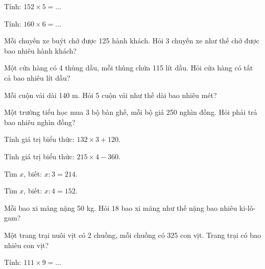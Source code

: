 \begin{ex}
Tính: $152 \times 5 = \dots$
\end{ex}

\begin{ex}
Tính: $160 \times 6 = \dots$
\end{ex}

\begin{ex}
Mỗi chuyến xe buýt chở được 125 hành khách. Hỏi 3 chuyến xe như thế chở được bao nhiêu hành khách?
\end{ex}

\begin{ex}
Một cửa hàng có 4 thùng dầu, mỗi thùng chứa 115 lít dầu. Hỏi cửa hàng có tất cả bao nhiêu lít dầu?
\end{ex}

\begin{ex}
Mỗi cuộn vải dài 140 m. Hỏi 5 cuộn vải như thế dài bao nhiêu mét?
\end{ex}

\begin{ex}
Một trường tiểu học mua 3 bộ bàn ghế, mỗi bộ giá 250 nghìn đồng. Hỏi phải trả bao nhiêu nghìn đồng?
\end{ex}

\begin{ex}
Tính giá trị biểu thức: $132 \times 3 + 120$.
\end{ex}

\begin{ex}
Tính giá trị biểu thức: $215 \times 4 - 360$.
\end{ex}

\begin{ex}
Tìm $x$, biết: $x : 3 = 214$.
\end{ex}

\begin{ex}
Tìm $x$, biết: $x : 4 = 152$.
\end{ex}

\begin{ex}
Mỗi bao xi măng nặng 50 kg. Hỏi 18 bao xi măng như thế nặng bao nhiêu ki-lô-gam?
\end{ex}

\begin{ex}
Một trang trại nuôi vịt có 2 chuồng, mỗi chuồng có 325 con vịt. Trang trại có bao nhiêu con vịt?
\end{ex}

\begin{ex}
Tính: $111 \times 9 = \dots$
\end{ex}
